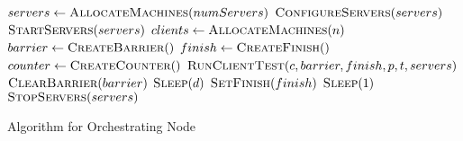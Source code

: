 \begin{algorithm}[ht!]
	\begin{algorithmic}
		\State $servers\gets \Call{AllocateMachines}{numServers}$
		\State $\Call {ConfigureServers}{servers}$
		\State $\Call {StartServers}{servers}$
		\State $clients\gets \Call{AllocateMachines}{n}$
		\State $barrier\gets \Call{CreateBarrier}{\null}$
		\State $finish\gets \Call{CreateFinish}{\null}$
		\State $counter\gets \Call{CreateCounter}{\null}$
		\State $\Call{RunClientTest}{c,barrier,finish,p,t,servers}$
		\EndFor
		\State {}
		\EndWhile
		\State $\Call{ClearBarrier}{barrier}$
		\State $\Call{Sleep}{d}$
		\State $\Call{SetFinish}{finish}$
		\State $\Call{Sleep}{1}$
		\EndWhile
		\State $\Call{StopServers}{servers}$
		\EndProcedure
		
	\end{algorithmic}
	\caption{Algorithm for Orchestrating Node}
	\label{algo:testClientMaster}
\end{algorithm}

